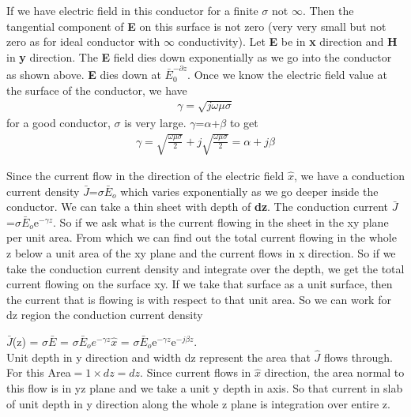 If we have electric field in this conductor for a finite $\sigma$ not $\infty$. Then the tangential component of \textbf{E} on this surface is not zero (very very small but not zero as for ideal conductor with $\infty$ conductivity). Let \textbf{E} be in \textbf{x} direction and \textbf{H} in \textbf{y} direction. The \textbf{E} field dies down exponentially as we go into the conductor as shown above. \textbf{E} dies down at $\bar{E}_0^{-\partial z}$. Once we know the electric field value at the surface of the conductor, we have
\begin{align}
\gamma=\sqrt{\textit{j}\omega\mu\sigma}
\end{align}
for a good conductor, $\sigma$ is very large. $\gamma$=$\alpha$+$\beta$ to get
\begin{align}
\gamma=\sqrt{\frac{\omega\mu\sigma}{2}}+\textit{j}\sqrt{\frac{\omega\mu\sigma}{2}}=\alpha+\textit{j}\beta
\end{align}

Since the current flow in the direction of the electric field $\hat{x}$, we have a conduction current density $\bar{J}$=$\sigma\bar{E}_o$ which varies exponentially as we go deeper inside the conductor. We can take a thin sheet with depth of \textbf{dz}. The conduction current $\bar{J}$=$\sigma\bar{E}_o$e$^{-\gamma z}$. So if we ask what is the current flowing in the sheet in the xy plane per unit area. From which we can find out the total current flowing in the whole z below a unit area of the xy plane and the current flows in x direction. So if we take the conduction current density and integrate over the depth, we get the total current flowing on the surface xy. If we take that surface as a unit surface, then the current that is flowing is with respect to that unit area. So we can work for dz region the conduction current density

$\bar{J}$(z) = $\sigma$$\bar{E}$ = $\sigma\bar{E}_oe^{-\gamma z} \hat{x}$ = $\sigma\bar{E}_o$e$^{-\gamma z}$e$^{-j\beta z}$.\\
Unit depth in y direction and width dz represent the area that $\hat{J}$ flows through. For this Area$=1\times dz=dz$. Since current flows in $\hat{x}$ direction, the area normal to this flow is in yz plane and we take a unit y depth in  axis. So that current in slab of unit depth in y direction along the whole z plane is integration over entire z.

